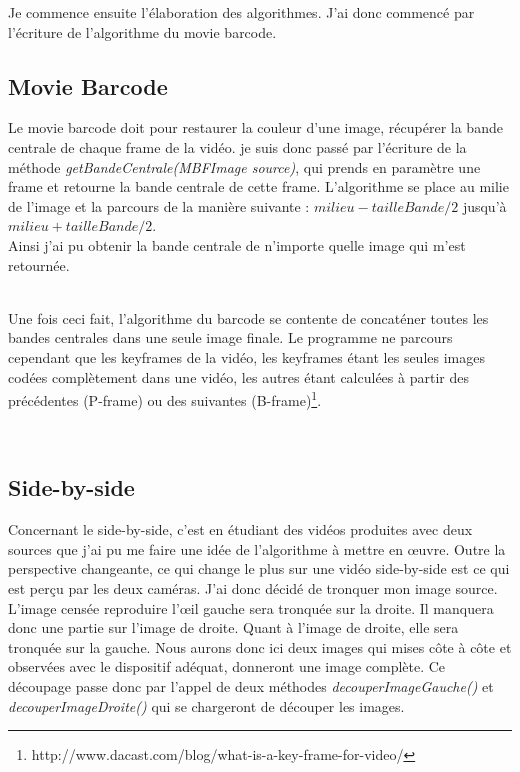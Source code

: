 \documentclass[10pt,a4paper]{article}
\begin{document}
Je commence ensuite l'élaboration des algorithmes. J'ai donc commencé par l'écriture de l'algorithme du movie barcode.
\subsection{Movie Barcode}

Le movie barcode doit pour restaurer la couleur d'une image, récupérer la bande centrale de chaque frame de la vidéo. je suis donc passé par l'écriture de la méthode \textit{getBandeCentrale(MBFImage source)},
qui prends en paramètre une frame et retourne la bande centrale de cette frame. L'algorithme se place au milie de l'image et la parcours de la manière suivante : $milieu - tailleBande /2$ jusqu'à
$milieu + tailleBande /2$.\\
Ainsi j'ai pu obtenir la bande centrale de n'importe quelle image qui m'est retournée.

~~\\

Une fois ceci fait, l'algorithme du barcode se contente de concaténer toutes les bandes centrales dans une seule image finale. Le programme ne parcours cependant que les keyframes de la vidéo,
les keyframes étant les seules images codées complètement dans une vidéo, les autres étant calculées à partir des précédentes
(P-frame) ou des suivantes (B-frame)\footnote{http://www.dacast.com/blog/what-is-a-key-frame-for-video/}.


~~\\




\subsection{Side-by-side}

Concernant le side-by-side, c'est en étudiant des vidéos produites avec deux sources que j'ai pu me faire une idée de l'algorithme à mettre en œuvre. Outre la perspective changeante,
ce qui change le plus sur une vidéo side-by-side est ce qui est perçu par les deux caméras. J'ai donc décidé de tronquer mon image source. L'image censée reproduire l'œil gauche sera tronquée sur la droite.
Il manquera donc une partie sur l'image de droite. Quant à l'image de droite, elle sera tronquée sur la gauche.  Nous aurons donc ici deux images qui mises côte à côte et observées avec le dispositif adéquat,
donneront une image complète.
Ce découpage passe donc par l'appel de deux méthodes \textit{decouperImageGauche()} et \textit{decouperImageDroite()} qui se chargeront de découper les images.
\end{document}
